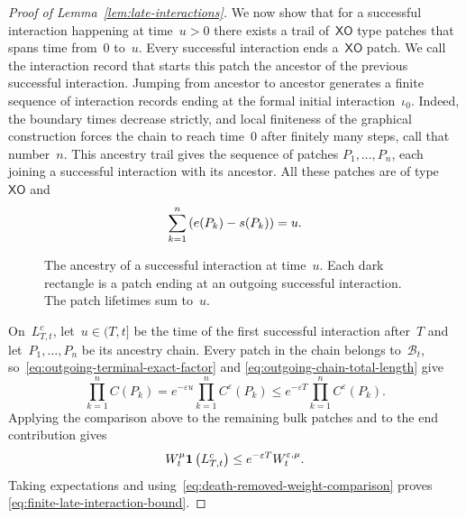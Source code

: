 \begin{proof}[Proof of Lemma~\ref{lem:late-interactions}]
We now show that for a successful interaction happening at time~$u>0$ there exists a trail of~$\mathsf{XO}$ type patches that spans time from~$0$ to~$u$. Every successful interaction ends a~$\mathsf{XO}$ patch. We call the interaction record that starts this patch the ancestor of the previous successful interaction. Jumping from ancestor to ancestor generates a finite sequence of interaction records ending at the formal initial interaction~$\iota_0$. Indeed, the boundary times decrease
strictly, and local finiteness of the graphical construction forces the chain
to reach time~$0$ after finitely many steps, call that number~$n$. This ancestry trail gives the sequence of patches
$P_1,\ldots,P_n$, each joining a successful interaction with its ancestor. All these patches are of type~$\mathsf{XO}$ and
\begin{equation}
\label{eq:outgoing-chain-total-length}
\sum_{k=1}^n\left(e(P_k)-s(P_k)\right)=u.
\end{equation}

\begin{figure}[htbp]
\centering

\caption{The ancestry of a successful interaction at time~$u$. Each dark
rectangle is a patch ending at an outgoing successful interaction. The patch lifetimes sum to~$u$.}
\label{fig:backward-outgoing-chain}
\end{figure}
\FloatBarrier

On~$L_{T,t}^c$, let~$u\in(T,t]$ be the time of the first successful interaction after~$T$
and let~$P_1,\ldots,P_n$ be its ancestry chain. Every patch in the chain belongs
to~$\mathcal B_t$, so~\eqref{eq:outgoing-terminal-exact-factor} and
\eqref{eq:outgoing-chain-total-length} give
\begin{equation*}
\prod_{k=1}^n C(P_k)
=
e^{-\varepsilon u}
\prod_{k=1}^n C^\varepsilon(P_k)
\leq
e^{-\varepsilon T}
\prod_{k=1}^n C^\varepsilon(P_k).
\end{equation*}
Applying the comparison above to the remaining bulk patches and to the end
contribution gives
\begin{equation*}
W_t^\mu\mathbf{1}\left(L_{T,t}^c\right)
\leq
e^{-\varepsilon T}W_t^{\varepsilon,\mu}.
\end{equation*}
Taking expectations and using~\eqref{eq:death-removed-weight-comparison} proves
\eqref{eq:finite-late-interaction-bound}.


\end{proof}
